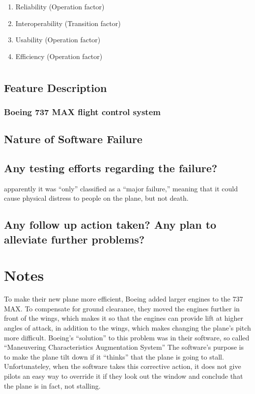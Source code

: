 \documentclass[letterpaper]{article}
\begin{document}
\begin{enumerate}
	\item Reliability (Operation factor)
	\item Interoperability (Transition factor)
	\item Usability (Operation factor)
	\item Efficiency (Operation factor)
\end{enumerate}

\section{}


	\subsection*{Feature Description}

	\subsubsection*{Boeing 737 MAX flight control system}

	\subsection*{Nature of Software Failure}

	\subsection*{Any testing efforts regarding the failure?}
	apparently it was ``only'' classified as a “major failure,” meaning that it could cause physical distress to people on the plane, but not death. 
	\cite{gates_2019}

	\subsection*{Any follow up action taken? Any plan to alleviate further problems?}

	\section{Notes}
	To make their new plane more efficient, Boeing added larger engines to the 737 MAX. 
	To compensate for ground clearance, they moved the engines further in front of the wings,
	which makes it so that the engines can provide lift at higher angles of attack, in addition to the wings, which makes
	changing the plane's pitch more difficult. Boeing's ``solution'' to this problem was in their software, 
	so called “Maneuvering Characteristics Augmentation System”\cite{ieeespectrum}
	The software's purpose is to make the plane tilt down if it ``thinks'' that the plane is going to stall. 
	Unfortunateley, when the software takes this corrective action, it does not give pilots an easy way to override it if
	they look out the window and conclude that the plane is in fact, not stalling. 



\nocite{*}
\printbibliography
\end{document}
